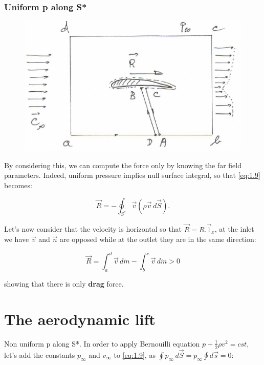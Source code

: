 		\subsubsection{Uniform p along S*}
				\begin{figure}
				\vspace{-5mm}
				\includegraphics[scale=0.55]{ch1/2}
				\end{figure}
				By considering this, we can compute the force only by knowing the far field parameters. Indeed, uniform pressure implies null surface integral, so that \eqref{eq:1.9} becomes:
				
				\begin{equation}
				\vec{R} = -\oint _{S^*} \vec{v} (\rho \vec{v} \, d\vec{S}).
				\end{equation}
				
				Let's now consider that the velocity is horizontal so that $\vec{R} = R.\vec{1}_x$, at the inlet we have $\vec{v}$ and $\vec{n}$ are opposed while at the outlet they are in the same direction: 
				
				\begin{equation}
				\vec{R} = \int _a^d \vec{v}\, d\dot{m} - \int _b^e \vec{v}\, d\dot{m} > 0
				\end{equation}
				
				showing that there is only \textbf{drag} force.
				
		\section{The aerodynamic lift}
			Non uniform p along S*. In order to apply Bernouilli equation $p + \frac{1}{2}\rho v^2 = cst$, let's add the constants $p_\infty$ and $v_\infty$ to \eqref{eq:1.9}, as $\oint p_\infty\, d\vec{S} = p_\infty \oint d\vec{s} = 0$: 
			
